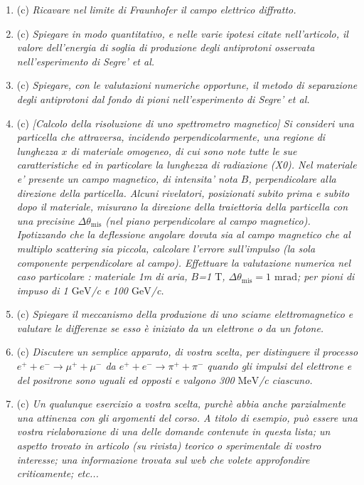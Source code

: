 \documentclass{article}
\renewcommand{\c}{(c)}
\renewcommand{\t}[1]{\textit{ #1}}
\begin{document}
\begin{enumerate}
{		e’ l’energia per unita’ di
		frequenza irraggiata da una carica accelerata in funzione dell’angolo di
		emissione.}
	\item\c\t{Ricavare nel limite di Fraunhofer il campo elettrico diffratto.}
	\item\c\t{Spiegare in modo quantitativo, e nelle varie ipotesi citate nell'articolo, il valore
		dell'energia di soglia di produzione degli antiprotoni osservata nell’esperimento di
		Segre’ et al.}
	\item\c\t{Spiegare, con le valutazioni numeriche opportune, il metodo di separazione degli
		antiprotoni dal fondo di pioni nell’esperimento di Segre’ et al.}
	\item\c\t{[Calcolo della risoluzione di uno spettrometro magnetico] Si consideri una
		particella che attraversa, incidendo perpendicolarmente, una regione di lunghezza
		$x$ di materiale omogeneo, di cui sono note tutte le sue caratteristiche ed in
		particolare la lunghezza di radiazione (X0). Nel materiale e' presente un campo
		magnetico, di intensita' nota $B$, perpendicolare alla direzione della particella.
		Alcuni rivelatori, posizionati subito prima e subito dopo il materiale, misurano la
		direzione della traiettoria della particella con una precisine $\Delta\theta_\mathrm{mis}$ (nel piano
		perpendicolare al campo magnetico). Ipotizzando che la deflessione angolare
		dovuta sia al campo magnetico che al multiplo scattering sia piccola, calcolare
		l'errore sull'impulso (la sola componente perpendicolare al campo). Effettuare la
		valutazione numerica nel caso particolare : materiale 1m di aria, $B$=1 $\mathrm{T}$, $\Delta\theta_\mathrm{mis}=1$ $\mathrm{mrad}$; per pioni di impuso di 1 $\mathrm{GeV}$/c e 100 $\mathrm{GeV}$/c.}
	\item\c\t{Spiegare il meccanismo della produzione di uno sciame elettromagnetico e
		valutare le differenze se esso è iniziato da un elettrone o da un fotone.}
	\item\c\t{Discutere un semplice apparato, di vostra scelta, per distinguere il processo
		$e^+ + e^- \to \mu^+ +\mu^-$
		da $e^+ + e^- \to \pi^+ + \pi^-$
		quando gli impulsi del elettrone e del
		positrone sono uguali ed opposti e valgono 300 $\mathrm{MeV}$/c ciascuno.}
	\item\c\t{Un qualunque esercizio a vostra scelta, purchè abbia anche parzialmente una
		attinenza con gli argomenti del corso. A titolo di esempio, può essere una vostra
		rielaborazione di una delle domande contenute in questa lista; un aspetto trovato
		in articolo (su rivista) teorico o sperimentale di vostro interesse; una
		informazione trovata sul web che volete approfondire criticamente; etc...}
\end{enumerate}
\end{document}
